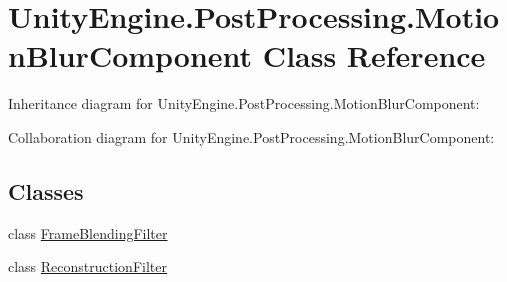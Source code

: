 \hypertarget{class_unity_engine_1_1_post_processing_1_1_motion_blur_component}{}\section{Unity\+Engine.\+Post\+Processing.\+Motion\+Blur\+Component Class Reference}
\label{class_unity_engine_1_1_post_processing_1_1_motion_blur_component}


Inheritance diagram for Unity\+Engine.\+Post\+Processing.\+Motion\+Blur\+Component\+:


Collaboration diagram for Unity\+Engine.\+Post\+Processing.\+Motion\+Blur\+Component\+:
\subsection*{Classes}
\begin{DoxyCompactItemize}
\item 
class \hyperlink{class_unity_engine_1_1_post_processing_1_1_motion_blur_component_1_1_frame_blending_filter}{Frame\+Blending\+Filter}
\item 
class \hyperlink{class_unity_engine_1_1_post_processing_1_1_motion_blur_component_1_1_reconstruction_filter}{Reconstruction\+Filter}
\end{DoxyCompactItemize}
